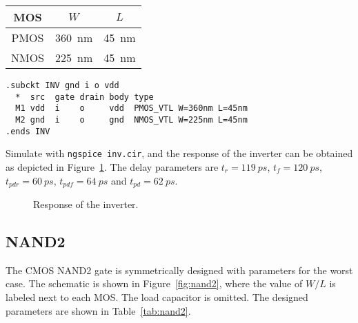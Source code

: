 \documentclass{scrartcl}
\newcommand{\includeres}[1]{\sffamily\scriptsize\vspace{-2em}}
\begin{document}
      \noindent\begin{minipage}[b]{\linewidth}
        \centering
        \begin{minipage}[b]{.45\linewidth}
          \centering
          
          \label{fig:inv}
        \end{minipage}
        \begin{minipage}[b]{.48\linewidth}
          \centering
          \begin{tabular}{ccc}
            \toprule
            MOS & $W$ & $L$ \\\midrule
            PMOS & \qty{360}{nm} & \qty{45}{nm} \\
            NMOS & \qty{225}{nm} & \qty{45}{nm} \\
            \bottomrule
          \end{tabular}
          \label{tab:inv}
        \end{minipage}
      \end{minipage}

      \begin{lstlisting}[title={Inverter Subcircuit}]
.subckt INV gnd i o vdd
  *  src  gate drain body type
  M1 vdd  i    o     vdd  PMOS_VTL W=360nm L=45nm
  M2 gnd  i    o     gnd  NMOS_VTL W=225nm L=45nm
.ends INV
      \end{lstlisting}

      Simulate with \texttt{ngspice inv.cir}, and
      the response of the inverter can be obtained as depicted in Figure~\ref{fig:inv_res}.
      The delay parameters are
      $t_r=\qty{119}{ps}$, 
      $t_f=\qty{120}{ps}$,
      $t_{pdr}=\qty{60}{ps}$,
      $t_{pdf}=\qty{64}{ps}$
      and $t_{pd}=\qty{62}{ps}$.
      \begin{figure}[htbp]
        \includeres{inv}
        \caption{Response of the inverter.}
        \label{fig:inv_res}
      \end{figure}
      \newpage

    \subsection{NAND2}\label{s:nand2}
      The CMOS NAND2 gate is symmetrically designed with parameters for the worst case.
      The schematic is shown in Figure~\ref{fig:nand2},
      where the value of $W/L$ is labeled next to each MOS.
      The load capacitor is omitted.
      The designed parameters are shown in Table~\ref{tab:nand2}.
\end{document}
